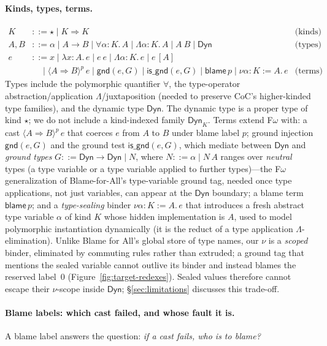 \documentclass[acmsmall,anonymous=false,nonacm]{acmart}
\newcommand{\dyn}{\ensuremath{\mathsf{Dyn}}}
\newcommand{\kstar}{\ensuremath{\star}}
\newcommand{\karr}{\ensuremath{\Rightarrow}}
\newcommand{\cast}[4]{\langle #2 \Rightarrow #3 \rangle^{#4}\, #1}
\newcommand{\gnd}[2]{\mathsf{gnd}(#1, #2)}
\newcommand{\isgnd}[2]{\mathsf{is\_gnd}(#1, #2)}
\newcommand{\blame}[1]{\mathsf{blame}\,#1}
\newcommand{\nub}[4]{\nu #1{:}#2 := #3.\,#4}
\begin{document}
\paragraph{Kinds, types, terms.}
\begin{align*}
K &::= \kstar \mid K \karr K & \text{(kinds)}\\
A, B &::= \alpha \mid A \to B \mid \forall \alpha{:}K.\,A \mid \Lambda \alpha{:}K.\,A \mid A\ B \mid \dyn & \text{(types)}\\
e &::= x \mid \lambda x{:}A.\,e \mid e\ e \mid \Lambda \alpha{:}K.\,e \mid e\,[A] \\
  &\quad \mid \cast{e}{A}{B}{p} \mid \gnd{e}{G} \mid \isgnd{e}{G} \mid \blame p \mid \nub{\alpha}{K}{A}{e} & \text{(terms)}
\end{align*}
Types include the polymorphic quantifier $\forall$, the type-operator
abstraction/application $\Lambda$/juxtaposition (needed to preserve CoC's
higher-kinded type families), and the dynamic type $\dyn$. The dynamic type is a
proper type of kind $\kstar$; we do not include a kind-indexed family
$\dyn_K$. Terms extend F$\omega$ with: a cast $\cast{e}{A}{B}{p}$ that coerces
$e$ from $A$ to $B$ under blame label $p$; ground injection $\gnd{e}{G}$ and the
ground test $\isgnd{e}{G}$, which mediate between $\dyn$ and \emph{ground types}
$G ::= \dyn \to \dyn \mid N$, where $N ::= \alpha \mid N\,A$ ranges over
\emph{neutral} types (a type variable or a type variable applied to further
types)---the F$\omega$ generalization of Blame-for-All's type-variable ground
tag, needed once type applications, not just variables, can appear at the
$\dyn$ boundary; a blame term $\blame p$; and a
\emph{type-sealing} binder $\nub{\alpha}{K}{A}{e}$ that introduces a fresh
abstract type variable $\alpha$ of kind $K$ whose hidden implementation is $A$,
used to model polymorphic instantiation dynamically (it is the reduct of a type
application $\Lambda$-elimination). Unlike Blame for All's global store of
type names, our $\nu$ is a \emph{scoped} binder, eliminated by commuting rules
rather than extruded; a ground tag that mentions the sealed variable cannot
outlive its binder and instead blames the reserved label~$0$
(Figure~\ref{fig:target-redexes}). Sealed values therefore cannot escape
their $\nu$-scope inside $\dyn$; \S\ref{sec:limitations} discusses this
trade-off. \paragraph{Blame labels: which cast failed, and whose fault it is.}
A blame label answers the question: \emph{if a cast fails, who is to blame?}
\end{document}
